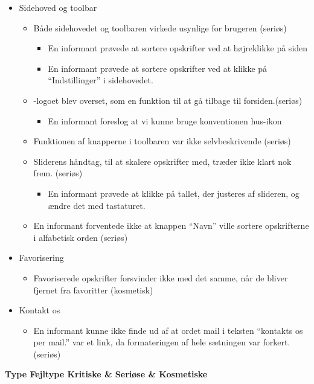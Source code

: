 \begin{itemize}[noitemsep]
\begin{itemize}[noitemsep]
  \end{itemize}
 \item Sidehoved og toolbar
  \begin{itemize}[noitemsep]
  \item Både sidehovedet og toolbaren virkede usynlige for brugeren (seriøs)
   \begin{itemize}[noitemsep]
   \item En informant prøvede at sortere opskrifter ved at højreklikke på siden
   \item En informant prøvede at sortere opskrifter ved at klikke på ``Indstillinger'' i sidehovedet.
   \end{itemize}
  \item \Foodl-logoet blev overset, som en funktion til at gå tilbage til forsiden.(seriøs)
   \begin{itemize}[noitemsep]
   \item En informant foreslog at vi kunne bruge konventionen hus-ikon
   \end{itemize}
  \item Funktionen af knapperne i toolbaren var ikke selvbeskrivende (seriøs)
  \item Sliderens håndtag, til at skalere opskrifter med, træder ikke klart nok frem. (seriøs)
   \begin{itemize}[noitemsep]
   \item En informant prøvede at klikke på tallet, der justeres af slideren, og ændre det med tastaturet.
   \end{itemize}
  \item En informant forventede ikke at knappen ``Navn'' ville sortere opskrifterne i alfabetisk orden (seriøs)
  \end{itemize}
 \item Favorisering
  \begin{itemize}[noitemsep]
  \item Favoriserede opskrifter forsvinder ikke med det samme, når de bliver fjernet fra favoritter (kosmetisk)
  \end{itemize}
 \item Kontakt os
  \begin{itemize}[noitemsep]
  \item En informant kunne ikke finde ud af at ordet mail i teksten ``kontakts os per mail.'' var et link, da formateringen af hele sætningen var forkert. (seriøs)
  \end{itemize}
\end{itemize}


\textbf{
           						 {Type}
       {Fejltype             	}{Kritiske   & Seriøse   & Kosmetiske}{
}
}
